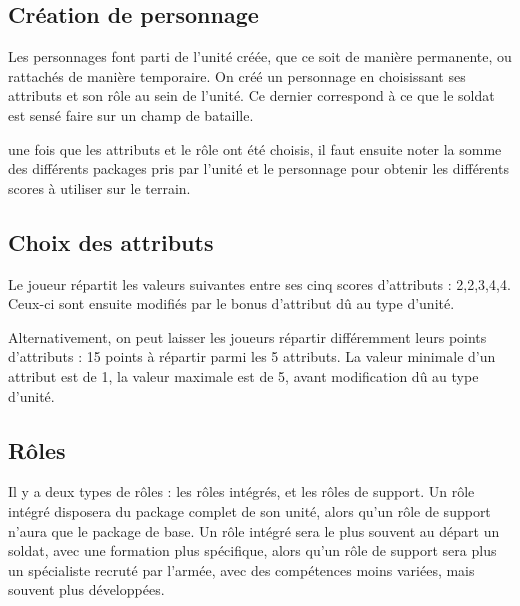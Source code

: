 \documentclass{report}
\begin{document}
\begin{multicols}{2}
\section{Création de personnage}
Les personnages font parti de l'unité créée, que ce soit de manière permanente, ou rattachés de manière temporaire.
On créé un personnage en choisissant ses attributs et son rôle au sein de l'unité. Ce dernier correspond à ce que le soldat est sensé faire sur un champ de bataille.

une fois que les attributs et le rôle ont été choisis, il faut ensuite noter la somme des différents packages pris par l'unité et le personnage pour obtenir les différents scores à utiliser sur le terrain.
\subsection{Choix des attributs}
Le joueur répartit les valeurs suivantes entre ses cinq scores d'attributs : 2,2,3,4,4. Ceux-ci sont ensuite modifiés par le bonus d'attribut dû au type d'unité.

Alternativement, on peut laisser les joueurs répartir différemment leurs points d'attributs : 15 points à répartir parmi les 5 attributs. La valeur minimale d'un attribut est de 1, la valeur maximale est de 5, avant modification dû au type d'unité.
\subsection{Rôles}
Il y a deux types de rôles : les rôles intégrés, et les rôles de support. Un rôle intégré disposera du package complet de son unité, alors qu'un rôle de support n'aura que le package de base. Un rôle intégré sera le plus souvent au départ un soldat, avec une formation plus spécifique, alors qu'un rôle de support sera plus un spécialiste recruté par l'armée, avec des compétences moins variées, mais souvent plus développées.

\end{multicols}
\end{document}
